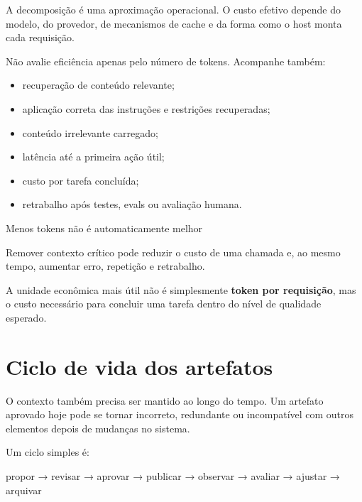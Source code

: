 \documentclass[
  10pt,
  a4paper,
  oneside]{book}
\newenvironment{Shaded}{}{}
\newcommand{\NormalTok}[1]{#1}
\providecommand{\tightlist}{%
  \setlength{\itemsep}{0pt}\setlength{\parskip}{0pt}}
\renewenvironment{Shaded}{\begin{snugshade}}{\end{snugshade}}%
\begin{document}
A decomposição é uma aproximação operacional. O custo efetivo depende do
modelo, do provedor, de mecanismos de cache e da forma como o host monta
cada requisição.

Não avalie eficiência apenas pelo número de tokens. Acompanhe também:

\begin{itemize}
\tightlist
\item
  recuperação de conteúdo relevante;
\item
  aplicação correta das instruções e restrições recuperadas;
\item
  conteúdo irrelevante carregado;
\item
  latência até a primeira ação útil;
\item
  custo por tarefa concluída;
\item
  retrabalho após testes, evals ou avaliação humana.
\end{itemize}

\begin{warningbox}{Menos tokens não é automaticamente melhor}

Remover contexto crítico pode reduzir o custo de uma chamada e, ao mesmo
tempo, aumentar erro, repetição e retrabalho.

A unidade econômica mais útil não é simplesmente \textbf{token por
requisição}, mas o custo necessário para concluir uma tarefa dentro do
nível de qualidade esperado.

\end{warningbox}

\hypertarget{ciclo-de-vida-dos-artefatos}{%
\section{Ciclo de vida dos
artefatos}\label{ciclo-de-vida-dos-artefatos}}

O contexto também precisa ser mantido ao longo do tempo. Um artefato
aprovado hoje pode se tornar incorreto, redundante ou incompatível com
outros elementos depois de mudanças no sistema.

Um ciclo simples é:

\begin{Shaded}
\begin{Highlighting}[]
\NormalTok{propor}
\NormalTok{→ revisar}
\NormalTok{→ aprovar}
\NormalTok{→ publicar}
\NormalTok{→ observar}
\NormalTok{→ avaliar}
\NormalTok{→ ajustar}
\NormalTok{→ arquivar}
\end{Highlighting}
\end{Shaded}
\end{document}
